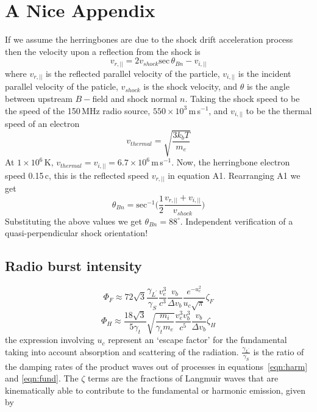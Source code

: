 
\chapter{A Nice Appendix}
\label{app:1}

If we assume the herringbones are due to the shock drift acceleration process then the velocity upon a reflection from the shock is
\begin{equation}
v_{r,||} = 2v_{shock}\mathrm{sec}\,\theta_{Bn} - v_{i,||}
\end{equation}
where $v_{r,||}$ is the reflected parallel velocity of the particle, $v_{i,||}$ is the incident parallel velocity of the paticle, $v_{shock}$ is the shock velocity, and $\theta$ is the angle between upstream $B-$field and shock normal $n$. Taking the shock speed to be the speed of the 150\,MHz radio source, $550\times10^3$\,m\,s$^{-1}$, and $v_{i,||}$ to be the thermal speed of an electron 
\begin{equation} 
v_{thermal} = \sqrt{ \frac{3k_bT}{m_e} }
\end{equation}
At $1\times10^{6}$\,K, $v_{thermal} = v_{i,||} = 6.7\times10^6$\,m\,s$^{-1}$. Now, the herringbone electron speed 0.15\,c, this is the reflected speed $v_{r,||}$ in equation A1. Rearranging A1 we get
\begin{equation}
\theta_{Bn} = \mathrm{sec}^{-1}\bigg( \frac{1}{2}\frac{v_{r,||} +  v_{i,||} }{v_{shock}}\bigg)
\end{equation}
Substituting the above values we get $\theta_{Bn}=88^{\circ}$. Independent verification of a quasi-perpendicular shock orientation!



\section{Radio burst intensity}


\begin{equation}
\Phi_F \approx 72\sqrt{3}   \frac{\gamma_{L^{'}}}{\gamma_S}   \frac{v_e^3}{c^3}   \frac{v_b}{\Delta v_b}   \frac{e^{-u_c^2}}{u_c\sqrt{\pi}}  \zeta_F
\end{equation}
\begin{equation}
\Phi_H \approx \frac{18\sqrt{3}}{5\gamma_t}   \sqrt{\frac{m_i}{\gamma_t m_e}}  \frac{v_e^3 v_b^3}{c^5} \frac{v_b}{\Delta v_b}\zeta_H
\end{equation}
the expression involving $u_c$ represent an \textquoteleft escape factor' for the fundamental taking into account absorption and scattering of the radiation. $ \frac{\gamma_{L^{'}}}{\gamma_S} $ is the ratio of the damping rates of the product waves out of processes in equations~\ref{eqn:harm} and \ref{eqn:fund}. The $\zeta$ terms are the fractions of Langmuir waves that are kinematically able to contribute to the fundamental or harmonic emission, given by

